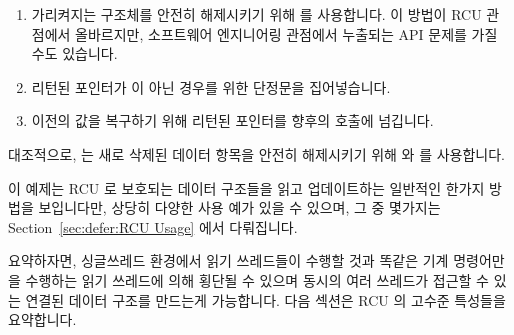 \begin{enumerate}
\item	가리켜지는 구조체를 안전히 해제시키기 위해  를
	사용합니다.
	이 방법이 RCU 관점에서 올바르지만, 소프트웨어 엔지니어링 관점에서
	누출되는 API 문제를 가질 수도 있습니다.
\item	리턴된 포인터가  이 아닌 경우를 위한 단정문을 집어넣습니다.
\item	이전의 값을 복구하기 위해 리턴된 포인터를 향후의 
	호출에 넘깁니다.

\end{enumerate}

대조적으로,  는 새로 삭제된 데이터 항목을 안전히 해제시키기
위해  와  를 사용합니다.

이 예제는 RCU 로 보호되는 데이터 구조들을 읽고 업데이트하는 일반적인 한가지
방법을 보입니다만, 상당히 다양한 사용 예가 있을 수 있으며, 그 중 몇가지는
Section~\ref{sec:defer:RCU Usage} 에서 다뤄집니다.

요약하자면, 싱글쓰레드 환경에서 읽기 쓰레드들이 수행할 것과 똑같은 기계
명령어만을 수행하는 읽기 쓰레드에 의해 횡단될 수 있으며 동시의 여러 쓰레드가
접근할 수 있는 연결된 데이터 구조를 만드는게 가능합니다.
다음 섹션은 RCU 의 고수준 특성들을 요약합니다.


